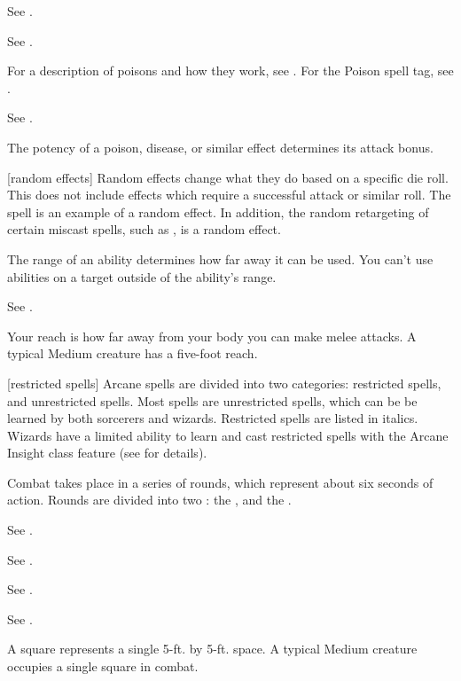  See .

 See .

 For a description of poisons and how they work, see . For the Poison spell tag, see .

 See .

 The potency of a poison, disease, or similar effect determines its attack bonus.

[random effects] Random effects change what they do based on a specific die roll.
This does not include effects which require a successful attack or similar roll.
The  spell is an example of a random effect.
In addition, the random retargeting of certain miscast spells, such as , is a random effect.

 The range of an ability determines how far away it can be used.
You can't use abilities on a target outside of the ability's range.

 See .

 Your reach is how far away from your body you can make melee attacks.
A typical Medium creature has a five-foot reach.

[restricted spells] Arcane spells are divided into two categories: restricted spells, and unrestricted spells. Most spells are unrestricted spells, which can be be learned by both sorcerers and wizards. Restricted spells are listed in italics. Wizards have a limited ability to learn and cast restricted spells with the Arcane Insight class feature (see  for details).

 Combat takes place in a series of rounds, which represent about six seconds of action.
Rounds are divided into two : the , and the .

 See .

 See .

 See .

 See .

 A square represents a single 5-ft. by 5-ft. space.
A typical Medium creature occupies a single square in combat.


